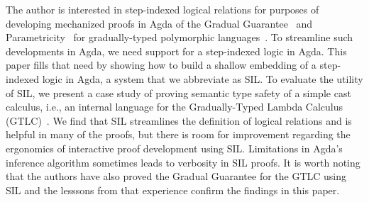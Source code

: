 \documentclass[acmsmall]{acmart}
\begin{document}
The author is interested in step-indexed logical relations for
purposes of developing mechanized proofs in Agda of the Gradual
Guarantee~\citep{Siek:2015ac} and Parametricity~\citep{REYNOLDS74C}
for gradually-typed polymorphic
languages~\citep{Ahmed:2011fk,Ahmed:2017aa,Igarashi:2017aa,New:2019ab,Labrada:2020tk}.
To streamline such developments in Agda, we need support for a
step-indexed logic in Agda. This paper fills that need by showing how
to build a shallow embedding of a step-indexed logic in Agda, a system
that we abbreviate as SIL. To evaluate the utility of SIL, we present
a case study of proving semantic type safety of a simple cast
calculus, i.e., an internal language for the Gradually-Typed Lambda
Calculus (GTLC)~\citep{Siek:2006bh,Siek:2007qy}. We find that SIL
streamlines the definition of logical relations and is helpful in many
of the proofs, but there is room for improvement regarding the
ergonomics of interactive proof development using SIL.  Limitations in
Agda's inference algorithm sometimes leads to verbosity in SIL
proofs. It is worth noting that the authors have also proved the
Gradual Guarantee for the GTLC using SIL and the lesssons from that
experience confirm the findings in this paper.




\end{document}
